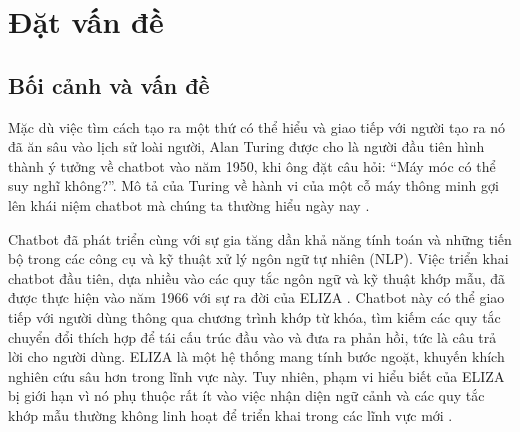 \chapter{Đặt vấn đề}
\label{chapter:introduction}
\section{Bối cảnh và vấn đề}
\label{section:background}


Mặc dù việc tìm cách tạo ra một thứ có thể hiểu và giao tiếp với người tạo ra nó đã ăn sâu vào lịch sử loài người, Alan Turing được cho là người đầu tiên hình thành ý tưởng về chatbot vào năm 1950, khi ông đặt câu hỏi: “Máy móc có thể suy nghĩ không?”. Mô tả của Turing về hành vi của một cỗ máy thông minh gợi lên khái niệm chatbot mà chúng ta thường hiểu ngày nay \cite{Turing1950-TURCMA}.


Chatbot đã phát triển cùng với sự gia tăng dần khả năng tính toán và những tiến bộ trong các công cụ và kỹ thuật xử lý ngôn ngữ tự nhiên (NLP). Việc triển khai chatbot đầu tiên, dựa nhiều vào các quy tắc ngôn ngữ và kỹ thuật khớp mẫu, đã được thực hiện vào năm 1966 với sự ra đời của ELIZA . Chatbot này có thể giao tiếp với người dùng thông qua chương trình khớp từ khóa, tìm kiếm các quy tắc chuyển đổi thích hợp để tái cấu trúc đầu vào và đưa ra phản hồi, tức là câu trả lời cho người dùng. ELIZA là một hệ thống mang tính bước ngoặt, khuyến khích nghiên cứu sâu hơn trong lĩnh vực này. Tuy nhiên, phạm vi hiểu biết của ELIZA bị giới hạn vì nó phụ thuộc rất ít vào việc nhận diện ngữ cảnh và các quy tắc khớp mẫu thường không linh hoạt để triển khai trong các lĩnh vực mới \cite{weizenbaum1966eliza,shum2018elizaxiaoicechallengesopportunities,zemcik2019chatbots}.


